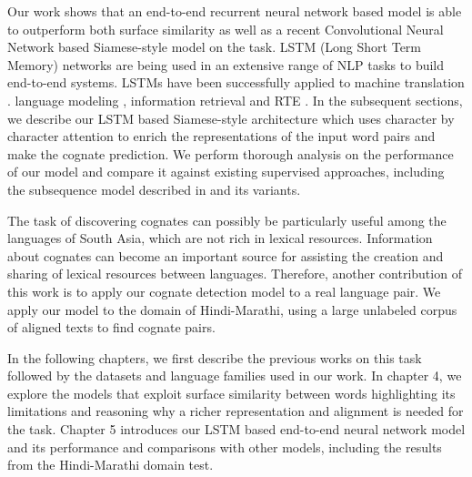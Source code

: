 Our work shows that an end-to-end recurrent neural network based model is able to outperform both surface similarity as well as a recent Convolutional Neural Network based Siamese-style model \citep{rama2016siamese} on the task. LSTM (Long Short Term Memory) networks are being used in an extensive range of NLP tasks to build end-to-end systems. LSTMs have been successfully applied to machine translation \citep{bahdanau2014neural}. language modeling \citep{mikolov2010recurrent}, information retrieval \citep{sordoni2015hierarchical} and RTE \citep{snli:emnlp2015}. In the subsequent sections, we describe our LSTM based Siamese-style architecture which uses character by character attention to enrich the representations of the input word pairs and make the cognate prediction. We perform thorough analysis on the performance of our model and compare it against existing supervised approaches, including the subsequence model described in \citep{rama2015automatic} and its variants.

The task of discovering cognates can possibly be particularly useful among the languages of South Asia, which are not rich in lexical resources. Information about cognates can become an important source for assisting the creation and sharing of lexical resources between languages. Therefore, another contribution of this work is to apply our cognate detection model to a real language pair. We apply our model to the domain of Hindi-Marathi, using a large unlabeled corpus of aligned texts to find cognate pairs.

In the following chapters, we first describe the previous works on this task followed by the datasets and language families used in our work. In chapter 4, we explore the models that exploit surface similarity between words highlighting its limitations and reasoning why a richer representation and alignment is needed for the task. Chapter 5 introduces our LSTM based end-to-end neural network model and its performance and comparisons with other models, including the results from the Hindi-Marathi domain test.
